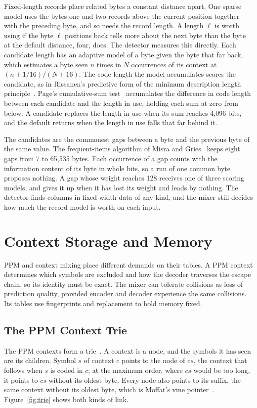 \documentclass[10pt,letterpaper]{article}
\begin{document}
Fixed-length records place related bytes a constant distance apart. One sparse model uses the bytes one and two records above the current position together with the preceding byte, and so needs the record length. A length $\ell$ is worth using if the byte $\ell$ positions back tells more about the next byte than the byte at the default distance, four, does. The detector measures this directly. Each candidate length has an adaptive model of a byte given the byte that far back, which estimates a byte seen $n$ times in $N$ occurrences of its context at $(n+1/16)/(N+16)$. The code length the model accumulates scores the candidate, as in Rissanen's predictive form of the minimum description length principle~\cite{rissanen}. Page's cumulative-sum test~\cite{page} accumulates the difference in code length between each candidate and the length in use, holding each sum at zero from below. A candidate replaces the length in use when its sum reaches 4,096 bits, and the default returns when the length in use falls that far behind it.

The candidates are the commonest gaps between a byte and the previous byte of the same value. The frequent-items algorithm of Misra and Gries~\cite{misragries} keeps eight gaps from 7 to 65,535 bytes. Each occurrence of a gap counts with the information content of its byte in whole bits, so a run of one common byte proposes nothing. A gap whose weight reaches 128 receives one of three scoring models, and gives it up when it has lost its weight and leads by nothing. The detector finds columns in fixed-width data of any kind, and the mixer still decides how much the record model is worth on each input.

\section{Context Storage and Memory}\label{sec:tables}
PPM and context mixing place different demands on their tables. A PPM context determines which symbols are excluded and how the decoder traverses the escape chain, so its identity must be exact. The mixer can tolerate collisions as loss of prediction quality, provided encoder and decoder experience the same collisions. Its tables use fingerprints and replacement to hold memory fixed.

\subsection{The PPM Context Trie}
The PPM contexts form a trie~\cite[Sec.~6.3]{knuth3}. A context is a node, and the symbols it has seen are its children. Symbol $s$ of context $c$ points to the node of $cs$, the context that follows when $s$ is coded in $c$; at the maximum order, where $cs$ would be too long, it points to $cs$ without its oldest byte. Every node also points to its suffix, the same context without its oldest byte, which is Moffat's vine pointer~\cite{moffatppm}. Figure~\ref{fig:trie} shows both kinds of link.
\end{document}
